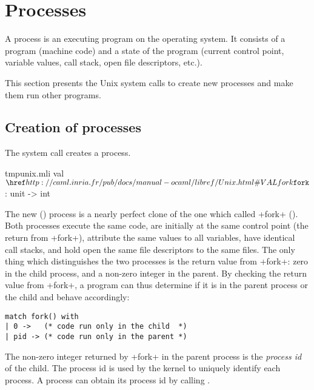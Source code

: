 %
%

\chapter{Processes}
\label{sec/processes}

A process is an executing program on the operating system.  It
consists of a program (machine code) and a state of the program
(current control point, variable values, call stack, open file
descriptors, etc.).

This section presents the Unix system calls to create new processes
and make them run other programs.

\section{Creation of processes}

The system call  creates a process.
%
\begin{listingcodefile}{tmpunix.mli}
val $\libvalue{Unix}{fork}$ : unit -> int
\end{listingcodefile}
%
The new () process is a nearly perfect clone of the
one which called \ml+fork+ ().  Both processes execute
the same code, are initially at the same control point (the return
from \ml+fork+), attribute the same values to all variables, have
identical call stacks, and hold open the same file descriptors to
the same files.  The only thing which distinguishes the two processes
is the return value from \ml+fork+: zero in the child process,
and a non-zero integer in the parent.  By checking the return value
from \ml+fork+, a program can thus determine if it is in the parent
process or the child and behave accordingly: 
%
\begin{lstlisting}
match fork() with
| 0 ->   (* code run only in the child  *)
| pid -> (* code run only in the parent *)
\end{lstlisting}
%
The non-zero integer returned by \ml+fork+ in the parent process
is the \emph{process id} of the child.  The process id is used by
the kernel to uniquely identify each process.  A process can obtain
its process id by calling .

